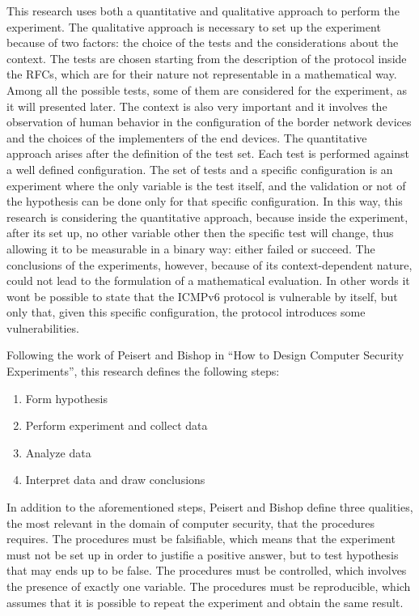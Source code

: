 \documentclass[12pt]{article}
\begin{document}
This research uses both a quantitative and qualitative approach to perform the experiment. The qualitative approach is necessary to set up the experiment because of two factors: the choice of the tests and the considerations about the context. The tests are chosen starting from the description of the protocol inside the RFCs, which are for their nature not representable in a mathematical way. Among all the possible tests, some of them are considered for the experiment, as it will presented later. The context is also very important and it involves the observation of human behavior in the configuration of the border network devices and the choices of the implementers of the end devices. The quantitative approach arises after the definition of the test set. Each test is performed against a well defined configuration. The set of tests and a specific configuration is an experiment where the only variable is the test itself, and the validation or not of the hypothesis can be done only for that specific configuration. In this way, this research is considering the quantitative approach, because inside the experiment, after its set up, no other variable other then the specific test will change, thus allowing it to be measurable in a binary way: either failed or succeed. The conclusions of the experiments, however, because of its context-dependent nature, could not lead to the formulation of a mathematical evaluation. In other words it wont be possible to state that the ICMPv6 protocol is vulnerable by itself, but only that, given this specific configuration, the protocol introduces some vulnerabilities.

Following the work of Peisert and Bishop in ``How to Design Computer Security Experiments'', this research defines the following steps:
\vspace{-10pt}
\begin{enumerate}[noitemsep,topsep=0pt,partopsep=0pt]
 \item Form hypothesis
 \item Perform experiment and collect data
 \item Analyze data
 \item Interpret data and draw conclusions
\end{enumerate}

In addition to the aforementioned steps, Peisert and Bishop define three qualities, the most relevant in the domain of computer security, that the procedures requires. The procedures must be falsifiable, which means that the experiment must not be set up in order to justifie a positive answer, but to test hypothesis that may ends up to be false. The procedures must be controlled, which involves the presence of exactly one variable. The procedures must be reproducible, which assumes that it is possible to repeat the experiment and obtain the same result.\cite{secExperiments}
\end{document}
